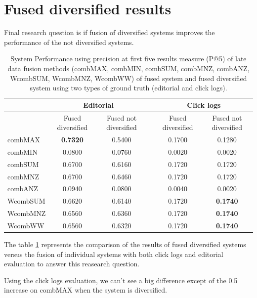 \section{Fused diversified results}

Final research question is if fusion of diversified systems improves the performance of the not diversified systems.

\begin{table}[H]
\begin{center}
\footnotesize
\caption{System Performance using precision at first five results measure (P@5) of late data fusion methods (combMAX, combMIN, combSUM, combMNZ, combANZ, WcombSUM, WcombMNZ, WcombWW) of fused system and fused diversified system using two types of ground truth (editorial and click logs).}
\label{table:ldfMmrP5}

\begin{tabular}{lccccc}
\toprule
 & \multicolumn{2}{c}{Editorial} & & \multicolumn{2}{c}{Click logs} \\
\midrule
 & Fused diversified & Fused not diversified &   & Fused diversified & Fused not diversified \\
 \midrule
	combMAX & \textbf{0.7320} & 0.5400 &   & 0.1700 & 0.1280 \\
	combMIN & 0.0800 & 0.0760 &   & 0.0020 & 0.0020 \\
	combSUM & 0.6700 & 0.6160 &   & 0.1720 & 0.1720 \\
	combMNZ & 0.6700 & 0.6460 &   & 0.1720 & 0.1720 \\
	combANZ & 0.0940 & 0.0800 &   & 0.0040 & 0.0020 \\
	WcombSUM & 0.6620 & 0.6140 &   & 0.1720 & \textbf{0.1740} \\
	WcombMNZ & 0.6560 & 0.6360 &   & 0.1720 & \textbf{0.1740} \\
	WcombWW & 0.6560 & 0.6320 &   & 0.1720 & \textbf{0.1740} \\
\bottomrule
\end{tabular}
\end{center}
\end{table}

The table \ref{table:ldfMmrP5} represents the comparison of the results of fused diversified systems versus the fusion of individual systems with both click logs and editorial evaluation to answer this reasearch question.

Using the click logs evaluation, we can't see a big difference except of the 0.5 increase on combMAX when the system is diversified.

